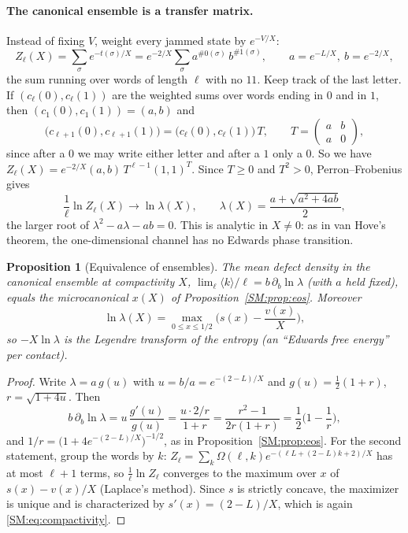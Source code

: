 \documentclass[11pt,openany]{book}
\theoremstyle{plain}
\newtheorem{proposition}[theorem]{Proposition}
\theoremstyle{definition}
\theoremstyle{remark}
\begin{document}
\paragraph{The canonical ensemble is a transfer matrix.} Instead of fixing $V$, weight every jammed
state by $e^{-V/X}$:
\[
  Z_\ell(X)=\sum_\sigma e^{-t(\sigma)/X}=e^{-2/X}\sum_\sigma a^{\#0(\sigma)}\,b^{\#1(\sigma)},\qquad a=e^{-L/X},\ b=e^{-2/X},
\]
the sum running over words of length $\ell$ with no $11$. Keep track of the last letter. If
$(c_\ell(0),c_\ell(1))$ are the weighted sums over words ending in $0$ and in $1$, then
$(c_1(0),c_1(1))=(a,b)$ and
\[
  \big(c_{\ell+1}(0),c_{\ell+1}(1)\big)=\big(c_\ell(0),c_\ell(1)\big)\,T,\qquad
  T=\begin{pmatrix}a&b\\a&0\end{pmatrix},
\]
since after a $0$ we may write either letter and after a $1$ only a $0$. So we have
$Z_\ell(X)=e^{-2/X}(a,b)\,T^{\ell-1}(1,1)^T$. Since $T\ge0$ and $T^2>0$, Perron--Frobenius gives
\[
  \frac1\ell\ln Z_\ell(X)\longrightarrow\ln\lambda(X),\qquad \lambda(X)=\frac{a+\sqrt{a^2+4ab}}2 ,
\]
the larger root of $\lambda^2-a\lambda-ab=0$. This is analytic in $X\ne0$: as in van Hove's theorem, the
one-dimensional channel has no Edwards phase transition.

\begin{proposition}[Equivalence of ensembles]\label{SM:prop:canon}
The mean defect density in the canonical ensemble at compactivity $X$,
$\lim_\ell\langle k\rangle/\ell=b\,\partial_b\ln\lambda$ (with $a$ held fixed), equals the microcanonical
$x(X)$ of Proposition~\ref{SM:prop:eos}. Moreover
\[
  \ln\lambda(X)=\max_{0\le x\le1/2}\Big(s(x)-\frac{v(x)}X\Big),
\]
so $-X\ln\lambda$ is the Legendre transform of the entropy (an ``Edwards free energy'' per contact).
\end{proposition}

\begin{proof}
Write $\lambda=a\,g(u)$ with $u=b/a=e^{-(2-L)/X}$ and $g(u)=\frac12(1+r)$, $r=\sqrt{1+4u}$. Then
\[
  b\,\partial_b\ln\lambda=u\,\frac{g'(u)}{g(u)}=\frac{u\cdot 2/r}{1+r}=\frac{r^2-1}{2r(1+r)}=\frac12\Big(1-\frac1r\Big),
\]
and $1/r=\big(1+4e^{-(2-L)/X}\big)^{-1/2}$, as in Proposition~\ref{SM:prop:eos}. For the second statement,
group the words by $k$: $Z_\ell=\sum_k\Omega(\ell,k)e^{-(\ell L+(2-L)k+2)/X}$ has at most $\ell+1$ terms, so
$\frac1\ell\ln Z_\ell$ converges to the maximum over $x$ of $s(x)-v(x)/X$ (Laplace's method). Since $s$ is strictly concave, the
maximizer is unique and is characterized by $s'(x)=(2-L)/X$, which is again \eqref{SM:eq:compactivity}.
\end{proof}
\end{document}
